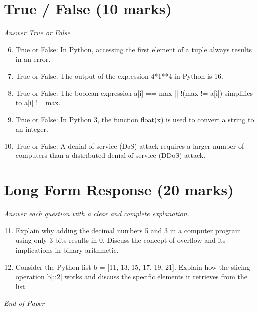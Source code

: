 \documentclass[12pt]{article}
\begin{document}
\section*{True / False (10 marks)}
\textit{Answer True or False}
\begin{enumerate}[label=\arabic*.]
\setcounter{enumi}{5}
\item True or False: In Python, accessing the first element of a tuple always results in an error.
\item True or False: The output of the expression 4*1**4 in Python is 16.
\item True or False: The boolean expression a[i] == max || !(max != a[i]) simplifies to a[i] != max.
\item True or False: In Python 3, the function float(x) is used to convert a string to an integer.
\item True or False: A denial-of-service (DoS) attack requires a larger number of computers than a distributed denial-of-service (DDoS) attack.
\end{enumerate}

\section*{Long Form Response (20 marks)}
\textit{Answer each question with a clear and complete explanation.}
\begin{enumerate}[label=\arabic*.]
\setcounter{enumi}{10}
\item Explain why adding the decimal numbers 5 and 3 in a computer program using only 3 bits
results in 0. Discuss the concept of overflow and its implications in binary arithmetic.
\item Consider the Python list b = [11, 13, 15, 17, 19, 21]. Explain how the slicing operation
b[::2] works and discuss the specific elements it retrieves from the list.
\end{enumerate}

\vfill
\noindent\textit{End of Paper}
\end{document}
